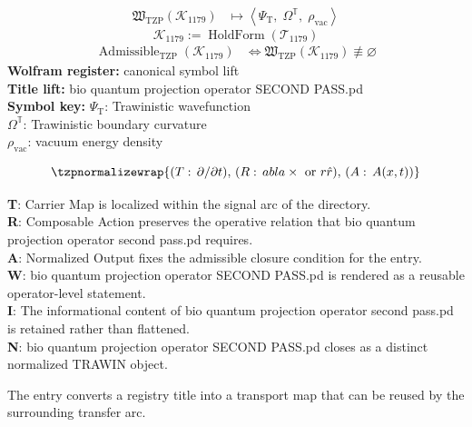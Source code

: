 \noindent
\begin{minipage}[t]{0.48\linewidth}
\begingroup
\small
\[
\begin{aligned}
\mathfrak{W}_{\mathrm{TZP}}\!\left(\mathcal{K}_{1179}\right)
&\longmapsto
\left\langle \Psi_{\mathrm{T}},\; \Omega^{\mathbb{T}},\; \rho_{\mathrm{vac}} \right\rangle
\end{aligned}
\]
\[
\mathcal{K}_{1179}
:=
\operatorname{HoldForm}\!\left(\mathcal{T}_{1179}\right)
\]
\[
\begin{aligned}
\operatorname{Admissible}_{\mathrm{TZP}}\!\left(\mathcal{K}_{1179}\right)
&\Longleftrightarrow
\mathfrak{W}_{\mathrm{TZP}}\!\left(\mathcal{K}_{1179}\right)\not\equiv\varnothing
\end{aligned}
\]
\textbf{Wolfram register:} canonical symbol lift\\
\textbf{Title lift:} bio quantum projection operator SECOND PASS.pd\\
\textbf{Symbol key:} \(\Psi_{\mathrm{T}}\): Trawinistic wavefunction\\ \(\Omega^{\mathbb{T}}\): Trawinistic boundary curvature\\ \(\rho_{\mathrm{vac}}\): vacuum energy density
\par
\endgroup
\end{minipage}\hfill
\begin{minipage}[t]{0.48\linewidth}
\[
\tzpnormalizewrap{(T:\,\partial/\partial t),\,(R:\, abla\times\text{ or }r\hat{r}),\,(A:\,A(x,t))}
\]

\small
\textbf{T}: Carrier Map is localized within the signal arc of the directory.\\
\textbf{R}: Composable Action preserves the operative relation that bio quantum projection operator second pass.pd requires.\\
\textbf{A}: Normalized Output fixes the admissible closure condition for the entry.\\
\textbf{W}: bio quantum projection operator SECOND PASS.pd is rendered as a reusable operator-level statement.\\
\textbf{I}: The informational content of bio quantum projection operator second pass.pd is retained rather than flattened.\\
\textbf{N}: bio quantum projection operator SECOND PASS.pd closes as a distinct normalized TRAWIN object.
\normalsize
\end{minipage}

The entry converts a registry title into a transport map that can be reused by the surrounding transfer arc.
\clearpage

